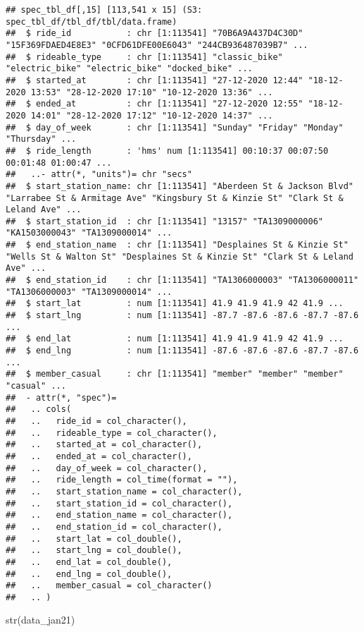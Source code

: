 \documentclass[
]{article}
\newenvironment{Shaded}{\begin{snugshade}}{\end{snugshade}}
\newcommand{\FunctionTok}[1]{\textcolor[rgb]{0.00,0.00,0.00}{#1}}
\newcommand{\NormalTok}[1]{#1}
\begin{document}
\begin{verbatim}
## spec_tbl_df[,15] [113,541 x 15] (S3: spec_tbl_df/tbl_df/tbl/data.frame)
##  $ ride_id           : chr [1:113541] "70B6A9A437D4C30D" "15F369FDAED4E8E3" "0CFD61DFE00E6043" "244CB936487039B7" ...
##  $ rideable_type     : chr [1:113541] "classic_bike" "electric_bike" "electric_bike" "docked_bike" ...
##  $ started_at        : chr [1:113541] "27-12-2020 12:44" "18-12-2020 13:53" "28-12-2020 17:10" "10-12-2020 13:36" ...
##  $ ended_at          : chr [1:113541] "27-12-2020 12:55" "18-12-2020 14:01" "28-12-2020 17:12" "10-12-2020 14:37" ...
##  $ day_of_week       : chr [1:113541] "Sunday" "Friday" "Monday" "Thursday" ...
##  $ ride_length       : 'hms' num [1:113541] 00:10:37 00:07:50 00:01:48 01:00:47 ...
##   ..- attr(*, "units")= chr "secs"
##  $ start_station_name: chr [1:113541] "Aberdeen St & Jackson Blvd" "Larrabee St & Armitage Ave" "Kingsbury St & Kinzie St" "Clark St & Leland Ave" ...
##  $ start_station_id  : chr [1:113541] "13157" "TA1309000006" "KA1503000043" "TA1309000014" ...
##  $ end_station_name  : chr [1:113541] "Desplaines St & Kinzie St" "Wells St & Walton St" "Desplaines St & Kinzie St" "Clark St & Leland Ave" ...
##  $ end_station_id    : chr [1:113541] "TA1306000003" "TA1306000011" "TA1306000003" "TA1309000014" ...
##  $ start_lat         : num [1:113541] 41.9 41.9 41.9 42 41.9 ...
##  $ start_lng         : num [1:113541] -87.7 -87.6 -87.6 -87.7 -87.6 ...
##  $ end_lat           : num [1:113541] 41.9 41.9 41.9 42 41.9 ...
##  $ end_lng           : num [1:113541] -87.6 -87.6 -87.6 -87.7 -87.6 ...
##  $ member_casual     : chr [1:113541] "member" "member" "member" "casual" ...
##  - attr(*, "spec")=
##   .. cols(
##   ..   ride_id = col_character(),
##   ..   rideable_type = col_character(),
##   ..   started_at = col_character(),
##   ..   ended_at = col_character(),
##   ..   day_of_week = col_character(),
##   ..   ride_length = col_time(format = ""),
##   ..   start_station_name = col_character(),
##   ..   start_station_id = col_character(),
##   ..   end_station_name = col_character(),
##   ..   end_station_id = col_character(),
##   ..   start_lat = col_double(),
##   ..   start_lng = col_double(),
##   ..   end_lat = col_double(),
##   ..   end_lng = col_double(),
##   ..   member_casual = col_character()
##   .. )
\end{verbatim}

\begin{Shaded}
\begin{Highlighting}[]
\FunctionTok{str}\NormalTok{(data\_jan21)}
\end{Highlighting}
\end{Shaded}
\end{document}
